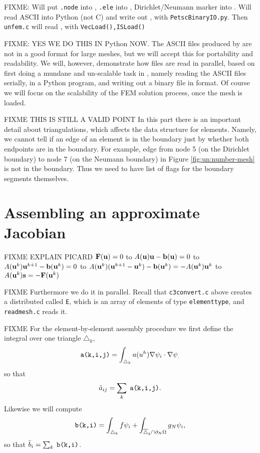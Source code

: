 FIXME: Will put \texttt{.node} into \pVec, \texttt{.ele} into \pIS, Dirichlet/Neumann marker into \pIS.  Will read ASCII into Python (not C) and write out \pVec, \pIS with \texttt{PetscBinaryIO.py}.  Then \texttt{unfem.c} will read \pVec, \pIS with \texttt{VecLoad(),ISLoad()}

FIXME: YES WE DO THIS IN Python NOW.  The ASCII files produced by \Triangle are not in a good format for large meshes, but we will accept this for portability and readability.  We will, however, demonstrate how files are read in parallel, based on first doing a mundane and un-scalable task in \PETSc, namely reading the ASCII \Triangle files serially, in a Python program, and writing out a binary file in \PETSc format.  Of course we will focus on the scalability of the FEM solution process, once the mesh is loaded.

FIXME THIS IS STILL A VALID POINT  In this part there is an important detail about triangulations, which affects the data structure for elements.  Namely, we cannot tell if an edge of an element is in the boundary just by whether both endpoints are in the boundary.  For example, edge from node 5 (on the Dirichlet boundary) to node 7 (on the Neumann boundary) in Figure \ref{fig:un:number-mesh} is not in the boundary.  Thus we need to have list of flags for the boundary segments themselves.


\section{Assembling an approximate Jacobian}

FIXME EXPLAIN PICARD $\mathbf{F}(\mathbf{u})=0$ to $A(\mathbf{u}) \mathbf{u} - \mathbf{b}(\mathbf{u})=0$ to $A(\mathbf{u}^k) \mathbf{u}^{k+1} - \mathbf{b}(\mathbf{u}^k)=0$ to $A(\mathbf{u}^k) (\mathbf{u}^{k+1}-\mathbf{u}^k) - \mathbf{b}(\mathbf{u}^k)= - A(\mathbf{u}^k) \mathbf{u}^k$ to $A(\mathbf{u}^k) \mathbf{s} = -\mathbf{F}(\mathbf{u}^k)$

FIXME Furthermore we do it in parallel.  Recall that \texttt{c3convert.c} above creates a distributed \pVec called \texttt{E}, which is an array of elements of type \texttt{elementtype}, and \texttt{readmesh.c} reads it.

FIXME For the element-by-element assembly procedure we first define the integral over one triangle $\triangle_k$,
\begin{equation}
\text{\texttt{a(k,i,j)}} = \int_{\triangle_k} a(u^h) \nabla \psi_i \cdot \nabla \psi_. \label{aelementintegral}
\end{equation}
so that
    $$\tilde a_{ij} = \sum_k \phantom{.}\text{\texttt{a(k,i,j)}}.$$
Likewise we will compute
\begin{equation}
\text{\texttt{b(k,i)}} = \int_{\triangle_k} f \psi_i + \int_{\overline{\triangle}_k \cap \partial_N\Omega} g_N \psi_i, \label{belementintegral}
\end{equation}
so that $\tilde b_i = \sum_{k} \;\text{\texttt{b(k,i)}}$.



